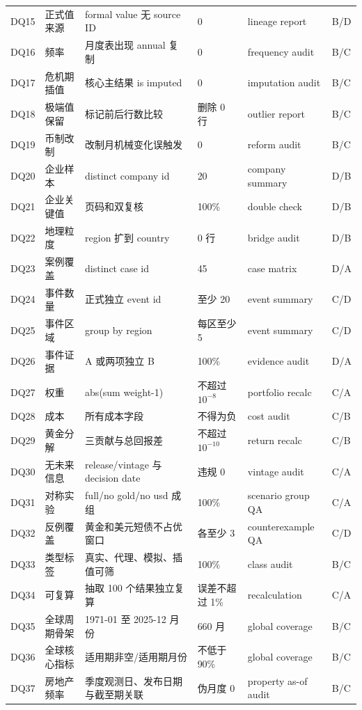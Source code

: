 \documentclass[UTF8,fontset=windows,12pt,openany]{ctexbook}
\begin{document}
\begin{landscape}
\begin{longtable}{p{1.7cm}p{4.0cm}p{4.6cm}p{3.0cm}p{3.2cm}p{2.7cm}}
DQ15 & 正式值来源 & formal value 无 source ID & 0 & lineage report & B/D\\
DQ16 & 频率 & 月度表出现 annual 复制 & 0 & frequency audit & B/C\\
DQ17 & 危机期插值 & 核心主结果 is imputed & 0 & imputation audit & B/C\\
DQ18 & 极端值保留 & 标记前后行数比较 & 删除 0 行 & outlier report & B/C\\
DQ19 & 币制改制 & 改制月机械变化误触发 & 0 & reform audit & B/C\\
DQ20 & 企业样本 & distinct company id & 20 & company summary & D/B\\
DQ21 & 企业关键值 & 页码和双复核 & 100\% & double check & D/B\\
DQ22 & 地理粒度 & region 扩到 country & 0 行 & bridge audit & D/B\\
DQ23 & 案例覆盖 & distinct case id & 45 & case matrix & D/A\\
DQ24 & 事件数量 & 正式独立 event id & 至少 20 & event summary & C/D\\
DQ25 & 事件区域 & group by region & 每区至少 5 & event summary & C/D\\
DQ26 & 事件证据 & A 或两项独立 B & 100\% & evidence audit & D/A\\
DQ27 & 权重 & abs(sum weight-1) & 不超过 \(10^{-8}\) & portfolio recalc & C/A\\
DQ28 & 成本 & 所有成本字段 & 不得为负 & cost audit & C/B\\
DQ29 & 黄金分解 & 三贡献与总回报差 & 不超过 \(10^{-10}\) & return recalc & C/B\\
DQ30 & 无未来信息 & release/vintage 与 decision date & 违规 0 & vintage audit & C/A\\
DQ31 & 对称实验 & full/no gold/no usd 成组 & 100\% & scenario group QA & C/A\\
DQ32 & 反例覆盖 & 黄金和美元短债不占优窗口 & 各至少 3 & counterexample QA & C/D\\
DQ33 & 类型标签 & 真实、代理、模拟、插值可筛 & 100\% & class audit & B/C\\
DQ34 & 可复算 & 抽取 100 个结果独立复算 & 误差不超过 1\% & recalculation & C/A\\
DQ35 & 全球周期骨架 & 1971-01 至 2025-12 月份 & 660 月 & global coverage & B/C\\
DQ36 & 全球核心指标 & 适用期非空/适用期月份 & 不低于 90\% & global coverage & B/C\\
DQ37 & 房地产频率 & 季度观测日、发布日期与截至期关联 & 伪月度 0 & property as-of audit & B/C\\

\end{longtable}
\end{landscape}
\end{document}
